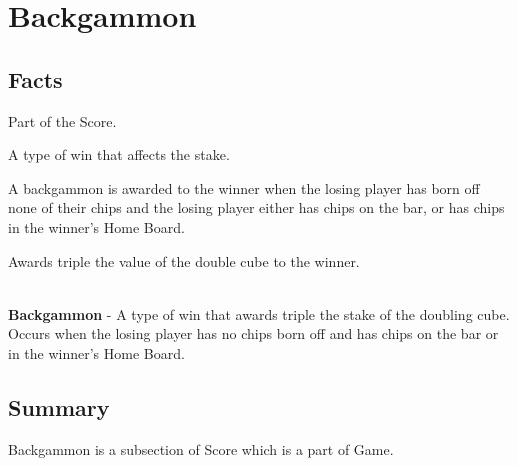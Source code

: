 \section{Backgammon}

\subsection{Facts}

\begin{dashed}
    \item Part of the Score.
    \item A type of win that affects the stake.
    \item A backgammon is awarded to the winner when the losing player has born off none of their chips and the losing player either has chips on the bar, or has chips in the winner's Home Board.
    \item Awards triple the value of the double cube to the winner.
\end{dashed}

\noindent \\
\textbf{Backgammon} - A type of win that awards triple the stake of the doubling cube. Occurs when the losing player has no chips born off and has chips on the bar or in the winner's Home Board.

\subsection{Summary}
Backgammon is a subsection of Score which is a part of Game.
